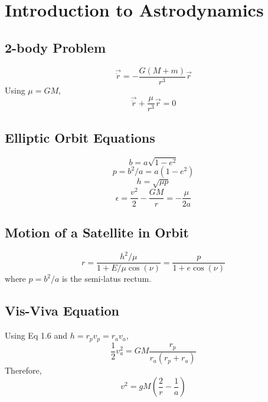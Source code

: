 \section{Introduction to Astrodynamics}

\subsection{2-body Problem}
\begin{equation}
  \vec{\ddot{r}} = -\frac{G(M+m)}{r^3}\vec{r}
\end{equation}
Using $\mu = GM$,
\begin{equation}
  \vec{\ddot{r}} + \frac{\mu}{r^3}\vec{r} = 0
\end{equation}

\subsection{Elliptic Orbit Equations}
\begin{equation}
  b=a\sqrt{1-e^2}
\end{equation}
\begin{equation}
  p=b^2/a = a(1-e^2)
\end{equation}
\begin{equation}
  h=\sqrt{\mu p}
\end{equation}
\begin{equation}
  \epsilon=\frac{v^2}{2}-\frac{GM}{r}=-\frac{\mu}{2a}
\end{equation}

\subsection{Motion of a Satellite in Orbit}
\begin{equation}
  r = \frac{h^2/\mu}{1+E/\mu\cos(\nu)} = \frac{p}{1+e\cos(\nu)}
\end{equation}
where $p=b^2/a$ is the semi-latus rectum.

\subsection{Vis-Viva Equation}
Using Eq 1.6 and $h=r_pv_p=r_av_a$,
\begin{equation}
  \frac{1}{2}v_a^2=GM \frac{r_p}{r_a(r_p+r_a)}
\end{equation}
Therefore,
\begin{equation}
  v^2 = gM(\frac{2}{r}-\frac{1}{a})
\end{equation}

